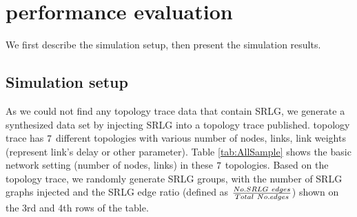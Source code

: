 \section{performance evaluation}
\label{sec:performance evaluation}
We first describe the simulation setup, then present the simulation results.
\subsection{Simulation setup}
As we could not find any topology trace data that contain SRLG, we generate a synthesized data  set by injecting SRLG into a topology trace published. topology trace has $7$ different topologies with various number of nodes, links, link weights (represent link's delay or other parameter).  Table \ref{tab:AllSample} shows the basic network setting (number of nodes, links) in these $7$ topologies. Based on the topology trace, we randomly generate SRLG groups, with the number of SRLG graphs injected and the SRLG edge ratio (defined as $\frac{{No.SRLG \  {\rm{ }}edges}}{{Total \  {\rm{ }}No.edges}}$) shown on the 3rd and 4th rows of the table.





